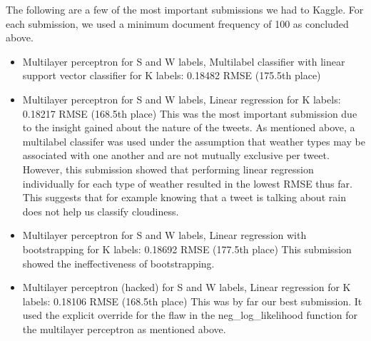 \documentclass{article}
\begin{document}
The following are a few of the most important submissions we had to Kaggle. For each submission, we used a minimum document frequency of 100 as concluded above.
\begin{itemize}
	\item Multilayer perceptron for S and W labels, Multilabel classifier with linear support vector classifier for K labels: 0.18482 RMSE (175.5th place)
	\item Multilayer perceptron for S and W labels, Linear regression for K labels: 0.18217 RMSE (168.5th place)
	This was the most important submission due to the insight gained about the nature of the tweets. As mentioned above, a multilabel classifer was used under the assumption that weather types may be associated with one another and are not mutually exclusive per tweet. However, this submission showed that performing linear regression individually for each type of weather resulted in the lowest RMSE thus far. This suggests that for example knowing that a tweet is talking about rain does not help us classify cloudiness.
	\item Multilayer perceptron for S and W labels, Linear regression with bootstrapping for K labels: 0.18692 RMSE (177.5th place)
	This submission showed the ineffectiveness of bootstrapping.
	\item Multilayer perceptron (hacked) for S and W labels, Linear regression for K labels: 0.18106 RMSE (168.5th place)
	This was by far our best submission. It used the explicit override for the flaw in the neg\_log\_likelihood function for the multilayer perceptron as mentioned above.
\end{itemize}
\end{document}
